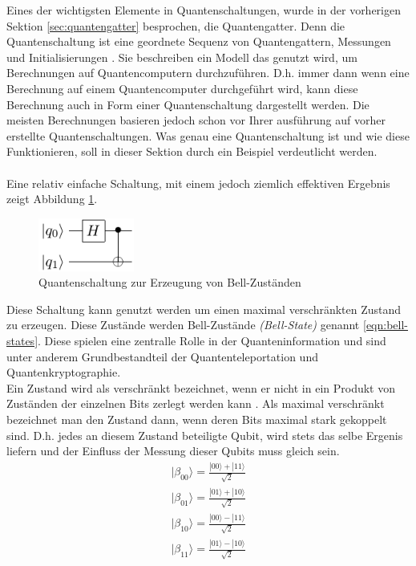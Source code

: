 Eines der wichtigsten Elemente in Quantenschaltungen, wurde in der vorherigen Sektion \ref{sec:quantengatter} besprochen, die Quantengatter. Denn die Quantenschaltung ist eine geordnete Sequenz von Quantengattern, Messungen und Initialisierungen \cite{Qiskit-Textbook}. Sie beschreiben ein Modell das genutzt wird, um Berechnungen auf Quantencomputern durchzuf\"uhren. D.h. immer dann wenn eine Berechnung auf einem Quantencomputer durchgef\"uhrt wird, kann diese Berechnung auch in Form einer Quantenschaltung dargestellt werden. Die meisten Berechnungen basieren jedoch schon vor Ihrer ausf\"uhrung auf vorher erstellte Quantenschaltungen. Was genau eine Quantenschaltung ist und wie diese Funktionieren, soll in dieser Sektion durch ein Beispiel verdeutlicht werden.\\\\
Eine relativ einfache Schaltung, mit einem jedoch ziemlich effektiven Ergebnis zeigt Abbildung \ref{fig:bell-circuit}.
\begin{figure}[h]
  \centering
  \includegraphics[width=0.28\textwidth]{figures/bell.pdf}
  \caption{Quantenschaltung zur Erzeugung von Bell-Zust\"anden}
  \label{fig:bell-circuit}
\end{figure}
Diese Schaltung kann genutzt werden um einen maximal verschr\"ankten Zustand zu erzeugen. Diese Zust\"ande werden Bell-Zust\"ande \textit{(Bell-State)} genannt \ref{eqn:bell-states}. Diese spielen eine zentralle Rolle in der Quanteninformation und sind unter anderem Grundbestandteil der Quantenteleportation und Quantenkryptographie.\\
Ein Zustand wird als verschr\"ankt bezeichnet, wenn er nicht in ein Produkt von Zust\"anden der einzelnen Bits zerlegt werden kann \cite{Homeister-2022}. Als maximal verschr\"ankt bezeichnet man den Zustand dann, wenn deren Bits maximal stark gekoppelt sind. D.h. jedes an diesem Zustand beteiligte Qubit, wird stets das selbe Ergenis liefern und der Einfluss der Messung dieser Qubits muss gleich sein.
\begin{equation}
  \begin{aligned} \label{eqn:bell-states}
    |\beta_{00}\rangle = \frac{|00\rangle + |11\rangle}{\sqrt{2}}\\
    |\beta_{01}\rangle = \frac{|01\rangle + |10\rangle}{\sqrt{2}}\\
    |\beta_{10}\rangle = \frac{|00\rangle - |11\rangle}{\sqrt{2}}\\
    |\beta_{11}\rangle = \frac{|01\rangle - |10\rangle}{\sqrt{2}} 
  \end{aligned}
\end{equation}
